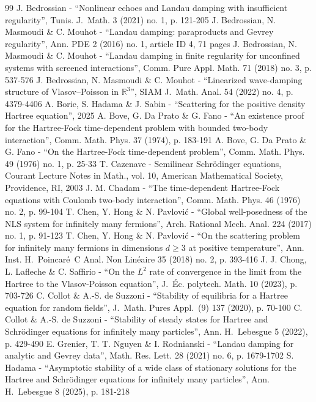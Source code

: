 \documentclass[10pt,a4paper]{article}
\theoremstyle{plain}
\theoremstyle{remark}
\begin{document}
\begin{thebibliography}{99}
 J. Bedrossian - “Nonlinear echoes and Landau damping with insufficient regularity”, Tunis. J. Math. 3 (2021) no. 1, p. 121-205
 J. Bedrossian, N. Masmoudi \& C. Mouhot - “Landau damping: paraproducts and Gevrey regularity”, Ann. PDE 2 (2016) no. 1, article ID 4, 71 pages
 J. Bedrossian, N. Masmoudi \& C. Mouhot - “Landau damping in finite regularity for unconfined systems with screened interactions”, Comm. Pure Appl. Math. 71 (2018) no. 3, p. 537-576
 J. Bedrossian, N. Masmoudi \& C. Mouhot - “Linearized wave-damping structure of Vlasov–Poisson in $\mathbb{R}^3$”, SIAM J. Math. Anal. 54 (2022) no. 4, p. 4379-4406
 A. Borie, S. Hadama \& J. Sabin - “Scattering for the positive density Hartree equation”, 2025
 A. Bove, G. Da Prato \& G. Fano - “An existence proof for the Hartree-Fock time-dependent problem with bounded two-body interaction”, Comm. Math. Phys. 37 (1974), p. 183-191
 A. Bove, G. Da Prato \& G. Fano - “On the Hartree-Fock time-dependent problem”, Comm. Math. Phys. 49 (1976) no. 1, p. 25-33
 T. Cazenave - Semilinear Schrödinger equations, Courant Lecture Notes in Math., vol. 10, American Mathematical Society, Providence, RI, 2003
 J. M. Chadam - “The time-dependent Hartree-Fock equations with Coulomb two-body interaction”, Comm. Math. Phys. 46 (1976) no. 2, p. 99-104
 T. Chen, Y. Hong \& N. Pavlović - “Global well-posedness of the NLS system for infinitely many fermions”, Arch. Rational Mech. Anal. 224 (2017) no. 1, p. 91-123
 T. Chen, Y. Hong \& N. Pavlović - “On the scattering problem for infinitely many fermions in dimensions $d\ge 3$ at positive temperature”, Ann. Inst. H. Poincaré C Anal. Non Linéaire 35 (2018) no. 2, p. 393-416
 J. J. Chong, L. Lafleche \& C. Saffirio - “On the $L^2$ rate of convergence in the limit from the Hartree to the Vlasov-Poisson equation”, J. Éc. polytech. Math. 10 (2023), p. 703-726
 C. Collot \& A.-S. de Suzzoni - “Stability of equilibria for a Hartree equation for random fields”, J. Math. Pures Appl. (9) 137 (2020), p. 70-100
 C. Collot \& A.-S. de Suzzoni - “Stability of steady states for Hartree and Schrödinger equations for infinitely many particles”, Ann. H. Lebesgue 5 (2022), p. 429-490
 E. Grenier, T. T. Nguyen \& I. Rodnianski - “Landau damping for analytic and Gevrey data”, Math. Res. Lett. 28 (2021) no. 6, p. 1679-1702
 S. Hadama - “Asymptotic stability of a wide class of stationary solutions for the Hartree and Schrödinger equations for infinitely many particles”, Ann. H. Lebesgue 8 (2025), p. 181-218

\end{thebibliography}
\end{document}
